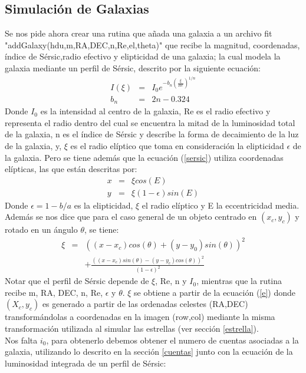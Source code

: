 \documentclass[twocolumn]{AS4201}
\begin{document}
\subsection{Simulación de Galaxias}
Se nos pide ahora crear una rutina que a\~nada una galaxia a un archivo fit "addGalaxy(hdu,m,RA,DEC,n,Re,el,theta)" que recibe la magnitud, coordenadas, índice de S\'ersic,radio efectivo y elipticidad de una galaxia; la cual modela la galaxia mediante un perfil de S\'ersic, descrito por la siguiente ecuación:
\begin{eqnarray}
	I(\xi) &=& I_0e^{ {-b_n \left( \frac{\xi}{Re}\right)^{1/n}}} \label{sersic}\\
	b_n &=& 2n-0.324
\end{eqnarray}
Donde $I_0$ es la intensidad al centro de la galaxia, Re es  el radio efectivo y representa el radio dentro del cual se encuentra la mitad de la luminosidad total de la galaxia, n es el índice de S\'ersic y describe la forma de decaimiento de la luz de la galaxia, y, $\xi$ es el radio elíptico que toma en consideración la elipticidad $\epsilon$ de la galaxia.
Pero se tiene además que la ecuación (\ref{sersic}) utiliza coordenadas elípticas, las que están descritas por:
\begin{eqnarray}\nonumber
	x &=& \xi cos(E)\\
	y &=& \xi(1-\epsilon)sin(E)
\end{eqnarray}
Donde $\epsilon=1-b/a$ es la elipticidad, $\xi$ el radio elíptico y E la eccentricidad media. Además se nos dice que para el caso general de un objeto centrado en $(x_c,y_c)$ y rotado en un ángulo $\theta$, se tiene:
\begin{eqnarray}\nonumber
	\xi &=&((x-x_c)cos(\theta)+(y-y_0)sin(\theta))^{2}\\
	& & +\frac{((x-x_c)sin(\theta)-(y-y_c)cos(\theta))^2}{(1-\epsilon)^2}\label{e} 
\end{eqnarray} 
Notar que el perfil de S\'ersic depende de $\xi$, Re, n y $I_0$, mientras que la rutina recibe m, RA, DEC, n, Re, $\epsilon$ y $\theta$. $\xi$ se obtiene a partir de la ecuación (\ref{e}) donde $(X_c,y_c)$ es generado a partir de las ordenadas celestes (RA,DEC) transformándolas a coordenadas en la imagen (row,col) mediante la misma transformación utilizada al simular las estrellas (ver sección \ref{estrella}).\\
Nos falta $i_0$, para obtenerlo debemos obtener el numero de cuentas asociadas a la galaxia, utilizando lo descrito en la sección \ref{cuentas} junto con la ecuación de la luminosidad integrada de un perfil de S\'ersic:
\end{document}

